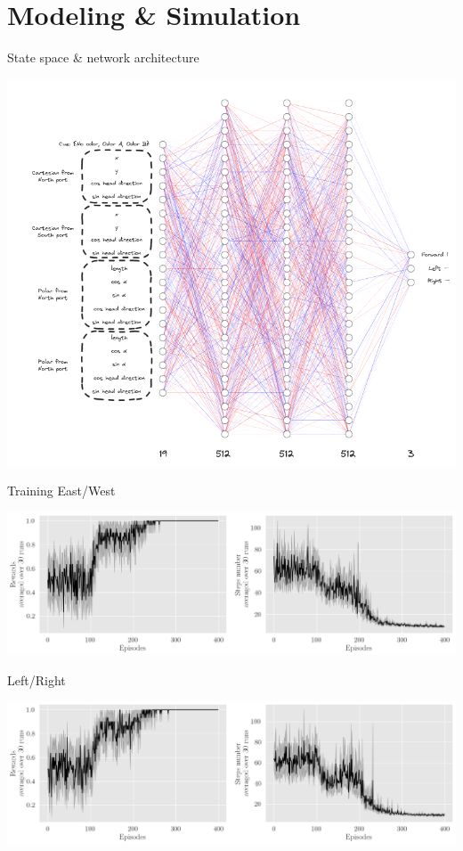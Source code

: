\documentclass[bigger]{beamer}
\begin{document}
\section{Modeling \& Simulation}
\label{sec:org06d7219}
\begin{frame}[label={sec:orge32646e}]{State space \& network architecture}
\begin{center}
\includegraphics[height=0.97\textheight]{medias/state-space-nn.png}
\end{center}
\end{frame}
\begin{frame}[label={sec:orge86a9b1}]{Training}
East/West
\begin{center}
\includegraphics[height=0.35\textheight]{medias/steps-and-rewards-EastWest.png}
\end{center}
Left/Right
\begin{center}
\includegraphics[height=0.35\textheight]{medias/steps-and-rewards-LeftRight.png}
\end{center}
\end{frame}
\end{document}
